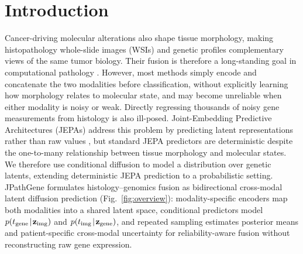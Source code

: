 \section{Introduction}

Cancer-driving molecular alterations also shape tissue morphology, making histopathology whole-slide images (WSIs) and genetic profiles complementary views of the same tumor biology. Their fusion is therefore a long-standing goal in computational pathology \cite{chen2021mcat,chen2022porpoise}. However, most methods simply encode and concatenate the two modalities before classification, without explicitly learning how morphology relates to molecular state, and may become unreliable when either modality is noisy or weak. Directly regressing thousands of noisy gene measurements from histology is also ill-posed. Joint-Embedding Predictive Architectures (JEPAs) address this problem by predicting latent representations rather than raw values \cite{lecun2022path,assran2023ijepa,bardes2024vjepa}, but standard JEPA predictors are deterministic despite the one-to-many relationship between tissue morphology and molecular states. We therefore use conditional diffusion \cite{ho2020ddpm,song2021score} to model a distribution over genetic latents, extending deterministic JEPA prediction to a probabilistic setting. JPathGene formulates histology--genomics fusion as bidirectional cross-modal latent diffusion prediction (Fig.~\ref{fig:overview}): modality-specific encoders map both modalities into a shared latent space, conditional predictors model $p(t_{\mathrm{gene}}\!\mid\!\mathbf{z}_{\mathrm{img}})$ and
$p(t_{\mathrm{img}}\!\mid\!\mathbf{z}_{\mathrm{gene}})$, and repeated sampling estimates posterior
means and patient-specific cross-modal uncertainty for reliability-aware fusion
without reconstructing raw gene expression.

